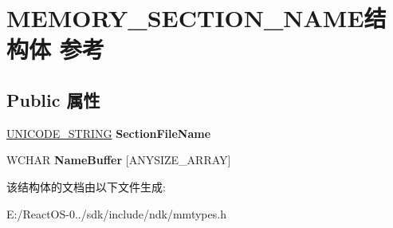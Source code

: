\hypertarget{struct_m_e_m_o_r_y___s_e_c_t_i_o_n___n_a_m_e}{}\section{M\+E\+M\+O\+R\+Y\+\_\+\+S\+E\+C\+T\+I\+O\+N\+\_\+\+N\+A\+M\+E结构体 参考}
\label{struct_m_e_m_o_r_y___s_e_c_t_i_o_n___n_a_m_e}
\subsection*{Public 属性}
\begin{DoxyCompactItemize}
\item 
\mbox{\label{struct_m_e_m_o_r_y___s_e_c_t_i_o_n___n_a_m_e_a293a7bf2eb3de03819e4561fca79f90e}} 
\hyperlink{struct___u_n_i_c_o_d_e___s_t_r_i_n_g}{U\+N\+I\+C\+O\+D\+E\+\_\+\+S\+T\+R\+I\+NG} {\bfseries Section\+File\+Name}
\item 
\mbox{\label{struct_m_e_m_o_r_y___s_e_c_t_i_o_n___n_a_m_e_ab8d4dfced9304b2c2a9bece8f8f78f2d}} 
W\+C\+H\+AR {\bfseries Name\+Buffer} \mbox{[}A\+N\+Y\+S\+I\+Z\+E\+\_\+\+A\+R\+R\+AY\mbox{]}
\end{DoxyCompactItemize}


该结构体的文档由以下文件生成\+:\begin{DoxyCompactItemize}
\item 
E\+:/\+React\+O\+S-\/0../sdk/include/ndk/mmtypes.\+h\end{DoxyCompactItemize}
